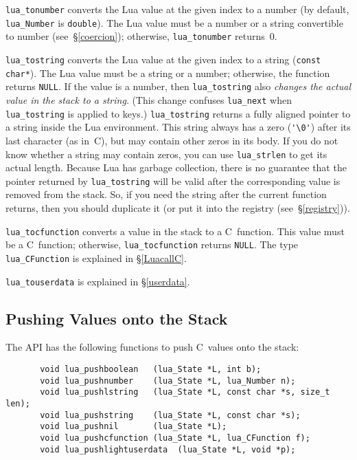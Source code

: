 \documentclass[11pt,twoside]{article}
\makeatletter
\newcommand{\See}[1]{\S\ref{#1}}
\newcommand{\see}[1]{(see~\See{#1})}
\newcommand{\DefAPI}[1]{\index{C API!#1@{\tt #1}}}
\makeatother
\begin{document}
\verb|lua_tonumber| converts the Lua value at the given index
to a number (by default, \verb|lua_Number| is \verb|double|).
\DefAPI{lua_Number}
The Lua value must be a number or a string convertible to number
\see{coercion}; otherwise, \verb|lua_tonumber| returns~0.

\verb|lua_tostring| converts the Lua value at the given index to a string
(\verb|const char*|).
The Lua value must be a string or a number;
otherwise, the function returns \verb|NULL|.
If the value is a number,
then \verb|lua_tostring| also
\emph{changes the actual value in the stack to a string}.
(This change confuses \verb|lua_next|
when \verb|lua_tostring| is applied to keys.)
\verb|lua_tostring| returns a fully aligned pointer
to a string inside the Lua environment.
This string always has a zero (\verb|'\0'|)
after its last character (as in~C),
but may contain other zeros in its body.
If you do not know whether a string may contain zeros,
you can use \verb|lua_strlen| to get its actual length.
Because Lua has garbage collection,
there is no guarantee that the pointer returned by \verb|lua_tostring|
will be valid after the corresponding value is removed from the stack.
So, if you need the string after the current function returns,
then you should duplicate it (or put it into the registry \see{registry}).

\verb|lua_tocfunction| converts a value in the stack to a C~function.
This value must be a C~function;
otherwise, \verb|lua_tocfunction| returns \verb|NULL|.
The type \verb|lua_CFunction| is explained in \See{LuacallC}.

\verb|lua_touserdata| is explained in \See{userdata}.


\subsection{Pushing Values onto the Stack}

The API has the following functions to
push C~values onto the stack:
\begin{verbatim}
       void lua_pushboolean   (lua_State *L, int b);
       void lua_pushnumber    (lua_State *L, lua_Number n);
       void lua_pushlstring   (lua_State *L, const char *s, size_t len);
       void lua_pushstring    (lua_State *L, const char *s);
       void lua_pushnil       (lua_State *L);
       void lua_pushcfunction (lua_State *L, lua_CFunction f);
       void lua_pushlightuserdata  (lua_State *L, void *p);
\end{verbatim}
\end{document}
